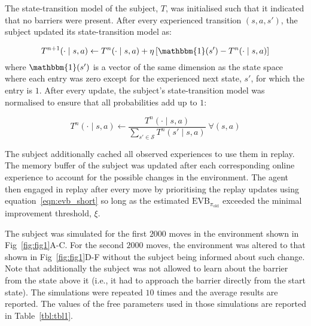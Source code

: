 The state-transition model of the subject, $T$, was initialised such that it indicated that no barriers were present. After every experienced transition $(s, a, s')$, the subject updated its state-transition model as:

\begin{equation*}
    T^{n+1}(\cdot \mid s, a) \leftarrow T^{n}(\cdot \mid s, a) + \eta \left[ \mathbbm{1}(s') - T^{n}(\cdot \mid s, a) \right]
\end{equation*}
where $\mathbbm{1}(s')$ is a vector of the same dimension as the state space where each entry was zero except for the experienced next state, $s'$, for which the entry is $1$. After every update, the subject's state-transition model was normalised to ensure that all probabilities add up to $1$:

\begin{equation*}
    T^n(\cdot \mid s, a) \leftarrow \frac{T^n(\cdot \mid s, a)}{\sum_{s' \in \mathcal{S}} T^n(s' \mid s, a)} \; \forall (s, a)
\end{equation*}

The subject additionally cached all observed experiences to use them in replay. The memory buffer of the subject was updated after each corresponding online experience to account for the possible changes in the environment. The agent then engaged in replay after every move by prioritising the replay updates using equation~\ref{eqn:evb_short} so long as the estimated $\text{EVB}_{\pi_{\text{old}}}$ exceeded the minimal improvement threshold, $\xi$. 

The subject was simulated for the first $2000$ moves in the environment shown in Fig~\ref{fig:fig1}A-C. For the second $2000$ moves, the environment was altered to that shown in Fig~\ref{fig:fig1}D-F without the subject being informed about such change. Note that additionally the subject was not allowed to learn about the barrier from the state above it (i.e., it had to approach the barrier directly from the start state). The simulations were repeated $10$ times and the average results are reported. The values of the free parameters used in those simulations are reported in Table~\ref{tbl:tbl1}.

